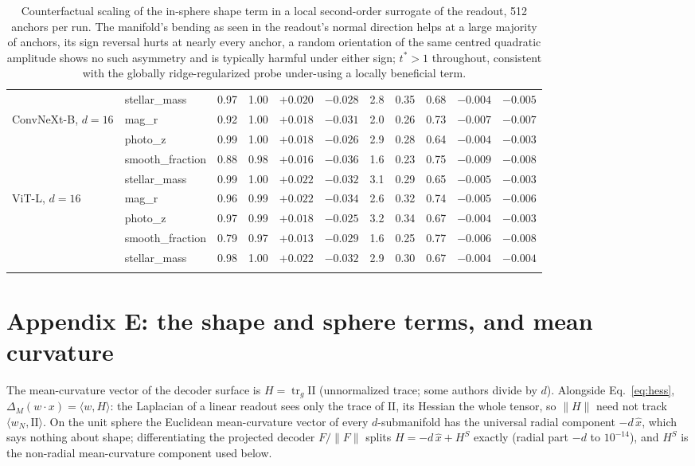 \documentclass{article}
\newcommand{\Htan}{H^{S}}
\newcommand{\norm}[1]{\lVert #1 \rVert}
\begin{document}
\begin{table}[h]
\begin{tabular}{llccccc|cccc}
 & stellar\_mass & 0.97 & 1.00 & $+0.020$ & $-0.028$ & 2.8 & 0.35 & 0.68 & $-0.004$ & $-0.005$ \\
\addlinespace[2pt]
ConvNeXt-B, $d=16$ & mag\_r & 0.92 & 1.00 & $+0.018$ & $-0.031$ & 2.0 & 0.26 & 0.73 & $-0.007$ & $-0.007$ \\
 & photo\_z & 0.99 & 1.00 & $+0.018$ & $-0.026$ & 2.9 & 0.28 & 0.64 & $-0.004$ & $-0.003$ \\
 & smooth\_fraction & 0.88 & 0.98 & $+0.016$ & $-0.036$ & 1.6 & 0.23 & 0.75 & $-0.009$ & $-0.008$ \\
 & stellar\_mass & 0.99 & 1.00 & $+0.022$ & $-0.032$ & 3.1 & 0.29 & 0.65 & $-0.005$ & $-0.003$ \\
\addlinespace[2pt]
ViT-L, $d=16$ & mag\_r & 0.96 & 0.99 & $+0.022$ & $-0.034$ & 2.6 & 0.32 & 0.74 & $-0.005$ & $-0.006$ \\
 & photo\_z & 0.97 & 0.99 & $+0.018$ & $-0.025$ & 3.2 & 0.34 & 0.67 & $-0.004$ & $-0.003$ \\
 & smooth\_fraction & 0.79 & 0.97 & $+0.013$ & $-0.029$ & 1.6 & 0.25 & 0.77 & $-0.006$ & $-0.008$ \\
 & stellar\_mass & 0.98 & 1.00 & $+0.022$ & $-0.032$ & 2.9 & 0.30 & 0.67 & $-0.004$ & $-0.004$ \\
\addlinespace[2pt]
\bottomrule
\end{tabular}
\caption{Counterfactual scaling of the in-sphere shape term in a local second-order surrogate of the readout, 512 anchors per run. The manifold's bending as seen in the readout's normal direction helps at a large majority of anchors, its sign reversal hurts at nearly every anchor, a random orientation of the same centred quadratic amplitude shows no such asymmetry and is typically harmful under either sign; $t^{*}>1$ throughout, consistent with the globally ridge-regularized probe under-using a locally beneficial term.}
\label{tab:cf}
\end{table}

\section*{Appendix E: the shape and sphere terms, and mean curvature}
\label{app:meancurv}
The mean-curvature vector of the decoder surface is $H = \operatorname{tr}_g \mathrm{II}$ (unnormalized trace; some authors divide by $d$). Alongside Eq.~\eqref{eq:hess}, $\Delta_M (w\!\cdot\! x) = \langle w, H\rangle$: the Laplacian of a linear readout sees only the trace of $\mathrm{II}$, its Hessian the whole tensor, so $\norm{H}$ need not track $\langle w_N,\mathrm{II}\rangle$. On the unit sphere the Euclidean mean-curvature vector of every $d$-submanifold has the universal radial component $-d\,\hat x$, which says nothing about shape; differentiating the projected decoder $F/\norm{F}$ splits $H = -d\,\hat x + \Htan$ exactly (radial part $-d$ to $10^{-14}$), and $\Htan$ is the non-radial mean-curvature component used below.
\end{document}
